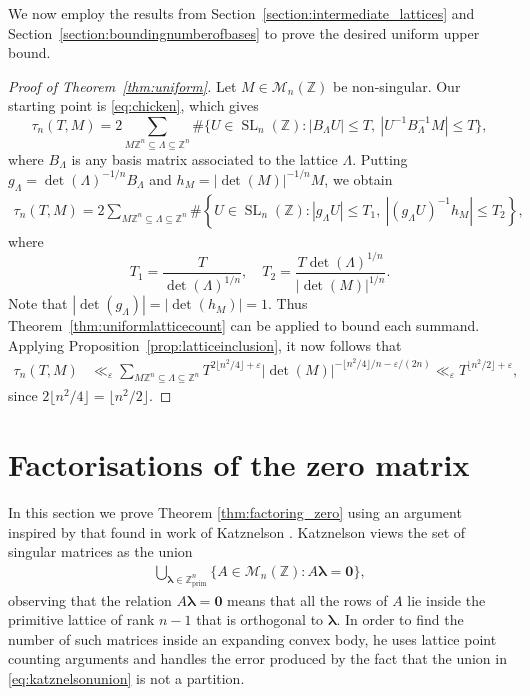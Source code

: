 \documentclass[11pt,reqno]{amsart}
\theoremstyle{definition}
\theoremstyle{remark}
\newcommand{\SL}{\operatorname{SL}}
\numberwithin{equation}{section}
\numberwithin{thm}{section}
\numberwithin{table}{section}
\def \Z {{\mathbb Z}}
\newcommand{\ZZp}{\mathbb Z_{\text{prim}}}
\begin{document}
We now employ the results from Section~\ref{section:intermediate_lattices} and Section~\ref{section:boundingnumberofbases} to prove the desired uniform upper bound.

\begin{proof}[Proof of Theorem~\ref{thm:uniform}]
    Let $M\in \mathcal{M}_n(\Z)$ be non-singular.
    Our starting point is \eqref{eq:chicken}, which gives
$$
        \tau_n(T,M) 
    =
    2
    \sum_{M\Z^n \subseteq \mathsf{\Lambda} \subseteq \Z^n} \# \{ 
    U \in \SL_n(\Z):  | B_\mathsf{\Lambda} U | \le T, \: | U^{-1}B_\mathsf{\Lambda}^{-1}M|\le T
    \},
    $$
where
$B_\mathsf{\Lambda}$ is any basis matrix 
associated to the lattice  $\mathsf{\Lambda}$.
Putting  $g_\mathsf{\Lambda} = \det(\mathsf{\Lambda})^{-1/n} B_\mathsf{\Lambda}$ and $h_M = |\det(M)|^{-1/n}M$, we obtain
    \begin{align*}
        \tau_n(T,M) 
    =
    2
    \sum_{M\Z^n \subseteq \mathsf{\Lambda} \subseteq \Z^n} \!\!\! \# \left\{ 
    U \in \SL_n(\Z):  | g_\mathsf{\Lambda} U | \le T_1, \: | (g_\mathsf{\Lambda}U)^{-1}h_M|\le 
    T_2
    \right\},
    \end{align*}
where
$$
T_1=\frac{T}{\det(\mathsf{\Lambda})^{1/n}} , \quad 
T_2=\frac{T\det(\mathsf{\Lambda})^{1/n}}{|\det(M)|^{1/n}}.
$$
Note that  $|\det(g_\mathsf{\Lambda}) |=|\det(h_M)|=1$. Thus  Theorem~\ref{thm:uniformlatticecount} can be applied to bound each summand. 
Applying Proposition~\ref{prop:latticeinclusion}, it now follows that 
    \begin{align*}
          \tau_n(T,M) 
    &\ll_{\varepsilon} 
     \sum_{M\Z^n \subseteq \mathsf{\Lambda} \subseteq \Z^n} T^{2 \lfloor n^2 /4 \rfloor + \varepsilon} |\det(M)|^{- \lfloor n^2 /4 \rfloor/n - \varepsilon/(2n)} \ll_{\varepsilon }  
      T^{ \lfloor n^2 /2 \rfloor + \varepsilon},
    \end{align*}
since 
    $2 \lfloor n^2 /4 \rfloor =  \lfloor n^2 /2 \rfloor$.
\end{proof}





\section{Factorisations of the zero matrix}\label{sec:On}


In this section we prove Theorem \ref{thm:factoring_zero} using an argument inspired by that found in work of 
Katznelson \cite{katznelson}.
Katznelson views the set of singular matrices as the union
\begin{align}\label{eq:katznelsonunion}
    \bigcup_{\boldsymbol{{\lambda}} \in \ZZp^n} \{ A \in \mathcal{M}_n(\Z): A\boldsymbol{{\lambda}} = \mathbf{0}  \},
\end{align}
observing that the relation $A\boldsymbol{{\lambda}} = \mathbf{0}$ means that all the rows of $A$ lie inside the primitive lattice of rank $n-1$ that is orthogonal to $\boldsymbol{\lambda}$. In order to find the number of such matrices inside an expanding convex body, he uses lattice point counting arguments and handles the error produced by the fact that the union in \eqref{eq:katznelsonunion} is not a partition.
\end{document}
